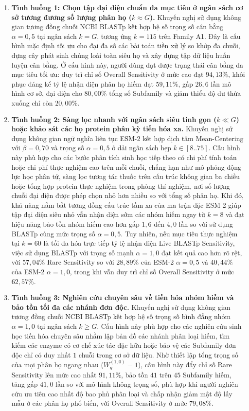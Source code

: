 \begin{enumerate}
    \item \textbf{Tình huống 1: Chọn tập đại diện chuẩn đa mục tiêu ở ngân sách cơ sở tương đương số lượng phân họ ($k \approx G$).} Khuyến nghị sử dụng không gian tương đồng chuỗi NCBI BLASTp kết hợp hệ số trọng số cân bằng $\alpha = 0{,}5$ tại ngân sách $k = G$, tương ứng $k = 115$ trên Family A1. Đây là cấu hình mặc định tối ưu cho đại đa số các bài toán tiền xử lý so khớp đa chuỗi, dựng cây phát sinh chủng loài toàn siêu họ và xây dựng tập dữ liệu huấn luyện cân bằng. Ở cấu hình này, người dùng đạt được trạng thái cân bằng đa mục tiêu tối ưu: duy trì chỉ số Overall Sensitivity ở mức cao đạt $94{,}13\%$, khôi phục đáng kể tỷ lệ nhận diện phân họ hiếm đạt $59{,}11\%$, gấp $26{,}6$ lần mô hình cơ sở, đại diện cho $80{,}00\%$ tổng số Subfamily và giảm thiểu độ dư thừa xuống chỉ còn $20{,}00\%$.
    
    \item \textbf{Tình huống 2: Sàng lọc nhanh với ngân sách siêu tinh gọn ($k \ll G$) hoặc khảo sát các họ protein phân kỳ tiến hóa xa.} Khuyến nghị sử dụng không gian ngữ nghĩa liên tục ESM-2 kết hợp dịch tâm Mean-Centering với $\beta = 0{,}70$ và trọng số $\alpha = 0{,}5$ ở dải ngân sách hẹp $k \in [8..75]$. Cấu hình này phù hợp cho các bước phân tích sinh học tiếp theo có chi phí tính toán hoặc chi phí thực nghiệm cao trên mỗi chuỗi, chẳng hạn như mô phỏng động lực học phân tử, sàng lọc tương tác thuốc trên cấu trúc không gian ba chiều hoặc tổng hợp protein thực nghiệm trong phòng thí nghiệm, nơi số lượng chuỗi đại diện được phép chọn nhỏ hơn nhiều so với tổng số phân họ. Khi đó, khả năng nắm bắt tương đồng cấu trúc tầm xa của ma trận đặc ESM-2 giúp tập đại diện siêu nhỏ vẫn nhận diện sớm các nhóm hiếm ngay từ $k = 8$ và đạt hiệu năng bảo tồn nhóm hiếm cao hơn gấp $1{,}6$ đến $4{,}0$ lần so với sử dụng BLASTp cùng mức trọng số $\alpha = 0{,}5$. Tuy nhiên, nếu mục tiêu thực nghiệm tại $k = 60$ là tối đa hóa trực tiếp tỷ lệ nhận diện Live BLASTp Sensitivity, việc sử dụng BLASTp với trọng số mạnh $\alpha = 1{,}0$ đạt kết quả cao hơn rõ rệt, với $57{,}04\%$ Rare Sensitivity so với $28{,}89\%$ của ESM-2 $\alpha = 0{,}5$ và $40{,}44\%$ của ESM-2 $\alpha = 1{,}0$, trong khi vẫn duy trì chỉ số Overall Sensitivity ở mức $62{,}57\%$.
    
    \item \textbf{Tình huống 3: Nghiên cứu chuyên sâu về tiến hóa nhóm hiếm và bảo tồn tối đa các nhánh đơn độc.} Khuyến nghị sử dụng không gian tương đồng chuỗi NCBI BLASTp kết hợp hệ số trọng số bình đẳng nhóm $\alpha = 1{,}0$ tại ngân sách $k \ge G$. Cấu hình này phù hợp cho các nghiên cứu sinh học tiến hóa chuyên sâu nhằm lập bản đồ các nhánh phân loại hiếm, tìm kiếm các enzyme có cơ chế xúc tác đặc hữu hoặc bảo vệ các Subfamily đơn độc chỉ có duy nhất $1$ chuỗi trong cơ sở dữ liệu. Nhờ thiết lập tổng trọng số của mọi phân họ ngang nhau ($W_g^{(1{,}0)} = 1$), cấu hình này đẩy chỉ số Rare Sensitivity lên mức cao nhất $91{,}11\%$, bảo tồn $41$ trên $45$ Subfamily hiếm, tăng gấp $41{,}0$ lần so với mô hình không trọng số, phù hợp khi người nghiên cứu ưu tiên cao nhất độ bao phủ phân loại và chấp nhận giảm mật độ lấy mẫu ở các phân họ phổ biến, với Overall Sensitivity ở mức $79{,}08\%$.
    

\end{enumerate}
